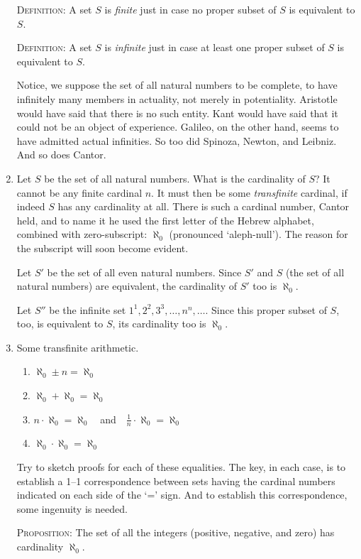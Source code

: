 \documentclass[polutonikogreek,english,twoside,openright]{article}
\begin{document}
\begin{enumerate}
  \textsc{Definition}: A set $S$ is \emph{finite} just in case no
  proper subset of $S$ is equivalent to $S$.

  \textsc{Definition}: A set $S$ is \emph{infinite} just in case at
  least one proper subset of $S$ is equivalent to $S$.

  Notice, we suppose the set of all natural numbers to be complete, to
  have infinitely many members in actuality, not merely in
  potentiality. Aristotle would have said that there is no such
  entity. Kant would have said that it could not be an object of
  experience. Galileo, on the other hand, seems to have admitted
  actual infinities. So too did Spinoza, Newton, and Leibniz. And so
  does Cantor.
\item \label{alephnull} Let $S$ be the set of all natural
  numbers. What is the cardinality of $S$? It cannot be any finite
  cardinal $n$. It must then be some \emph{transfinite} cardinal, if
  indeed $S$ has any cardinality at all. There is such a cardinal
  number, Cantor held, and to name it he used the first letter of the
  Hebrew alphabet, combined with zero-subscript: $\aleph_{0}$
  (pronounced `aleph-null'). The reason for the subscript will soon
  become evident. \label{subscript}

  Let $S'$ be the set of all even natural numbers. Since $S'$ and $S$
  (the set of all natural numbers) are equivalent, the cardinality of
  $S'$ too is $\aleph_{0}$.

  Let $S''$ be the infinite set $1^1, 2^2, 3^3, \dotsc, n^n,
  \dotsc$. Since this proper subset of $S$, too, is equivalent to $S$,
  its cardinality too is $\aleph_{0}$.
\item Some transfinite arithmetic.\label{transarith}
  \begin{enumerate}[(1)]
  \item $\aleph_{0}\pm n=\aleph_{0}$
  \item $\aleph_{0}+\aleph_{0}=\aleph_{0}$
  \item $n\cdot\aleph_{0}=\aleph_{0}$\ \ and\ \
    $\frac{1}{n}\cdot\aleph_{0}=\aleph_{0}$
  \item $\aleph_{0}\cdot\aleph_{0}=\aleph_{0}$
  \end{enumerate}
  Try to sketch proofs for each of these equalities. The key, in each
  case, is to establish a 1--1 correspondence between sets having the
  cardinal numbers indicated on each side of the `=' sign. And to
  establish this correspondence, some ingenuity is needed.

  \textsc{Proposition}: The set of all the integers (positive,
  negative, and zero) has cardinality $\aleph_{0}$.


\end{enumerate}
\end{document}
